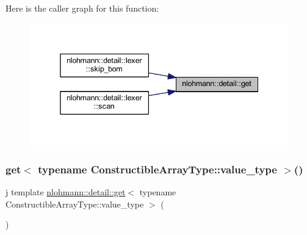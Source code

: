 Here is the caller graph for this function\+:
\nopagebreak
\begin{figure}[H]
\begin{center}
\leavevmode
\includegraphics[width=338pt]{namespacenlohmann_1_1detail_acc422c11342b31368f610b6f96fcedc6_icgraph}
\end{center}
\end{figure}
\mbox{\label{namespacenlohmann_1_1detail_ad9e016d7b6a3cd2847027950aa0aac3b}} 
\subsubsection{\texorpdfstring{get$<$ typename ConstructibleArrayType::value\_type $>$()}{get< typename ConstructibleArrayType::value\_type >()}}
{\footnotesize\ttfamily j template \mbox{\hyperlink{namespacenlohmann_1_1detail_acc422c11342b31368f610b6f96fcedc6}{nlohmann\+::detail\+::get}}$<$ typename Constructible\+Array\+Type\+::value\+\_\+type $>$ (\begin{DoxyParamCaption}{ }\end{DoxyParamCaption})}

\mbox{\label{namespacenlohmann_1_1detail_a85955b9c6dd31846e4b8e891f78614b6}} 
